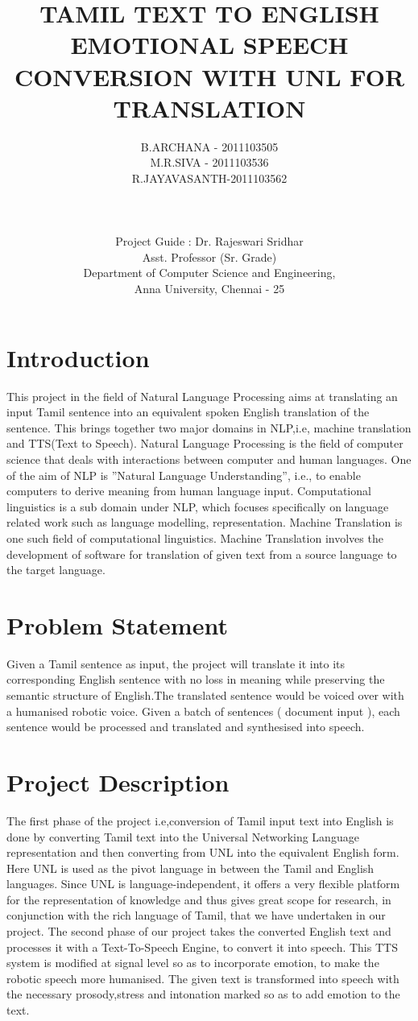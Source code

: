 \documentclass{article}
\title{TAMIL TEXT TO ENGLISH EMOTIONAL SPEECH CONVERSION WITH UNL FOR TRANSLATION
}
\author{B.ARCHANA - 2011103505 \\ M.R.SIVA - 2011103536\\R.JAYAVASANTH-2011103562\\\\\\\\Project Guide : Dr. Rajeswari Sridhar\\Asst. Professor (Sr. Grade)\\Department of Computer Science and Engineering,\\
Anna University, Chennai - 25}
\begin{document}
\maketitle

\section{Introduction}\large
This project in the field of Natural Language Processing aims at
translating an input Tamil sentence into an equivalent spoken English
translation of the sentence. This brings together two major domains in
NLP,i.e, machine translation and TTS(Text to Speech). Natural
Language Processing is the field of computer science that deals with
interactions between computer and human languages. One of the aim
of NLP is ”Natural Language Understanding”, i.e., to enable computers
to derive meaning from human language input. Computational
linguistics is a sub domain under NLP, which focuses specifically on
language related work such as language modelling, representation.
Machine Translation is one such field of computational linguistics.
Machine Translation involves the development of software for
translation of given text from a source language to the target
language.
\section{Problem Statement}\large
Given a Tamil sentence as input, the project will translate it into its corresponding English sentence with no loss in meaning while preserving the semantic structure of English.The translated sentence would be voiced over with a humanised robotic voice. Given a batch of sentences ( document input ), each sentence would be processed and translated and synthesised into speech.
\section{Project Description}\large
The first phase of the project i.e,conversion of Tamil input text
into English is done by converting Tamil text into the Universal
Networking Language representation and then converting from UNL into
the equivalent English form. Here UNL is used as the pivot language in
between the Tamil and English languages. Since UNL is
language-independent, it offers a very flexible platform for the
representation of knowledge and thus gives great scope for research,
in conjunction with the rich language of Tamil, that we have
undertaken in our project.
The second phase of our project takes the converted English text and
processes it with a Text-To-Speech Engine, to convert it into speech.
This TTS system is modified at signal level so as to incorporate
emotion, to make the robotic speech more humanised. The given text
is transformed into speech with the necessary prosody,stress and
intonation marked so as to add emotion to the text.
\end{document}
